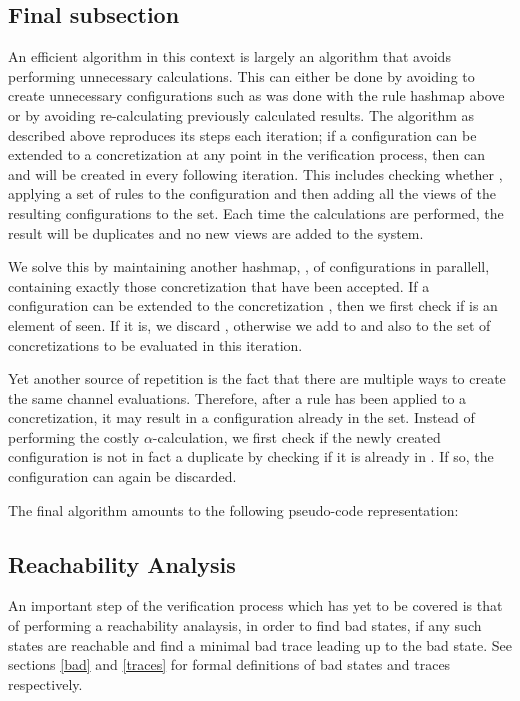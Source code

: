\subsection{Final subsection}
An efficient algorithm in this context is largely an algorithm that avoids performing unnecessary calculations. This can either be done by avoiding to create unnecessary configurations such as was done with the rule hashmap above or by avoiding re-calculating previously calculated results. The algorithm as described above reproduces its steps each iteration; if a configuration  can be extended to a concretization  at any point in the verification process, then  can and will be created in every following iteration. This includes checking whether , applying a set of rules to the configuration and then adding all the views of the resulting configurations to the set. Each time the calculations are performed, the result will be duplicates and no new views are added to the system.

We solve this by maintaining another hashmap, , of configurations in parallell, containing exactly those concretization that have been accepted. If a configuration  can be extended to the concretization , then we first check if  is an element of seen. If it is, we discard , otherwise we add  to  and also to the set of concretizations to be evaluated in this iteration.

Yet another source of repetition is the fact that there are multiple ways to create the same channel evaluations. Therefore, after a rule has been applied to a concretization, it may result in a configuration already in the set. Instead of performing the costly $\alpha$-calculation, we first check if the newly created configuration is not in fact a duplicate by checking if it is already in . If so, the configuration can again be discarded.

The final algorithm amounts to the following pseudo-code representation:

\subsection{Reachability Analysis}
An important step of the verification process which has yet to be covered is that of performing a reachability analaysis, in order to find bad states, if any such states are reachable and find a minimal bad trace leading up to the bad state. See sections \ref{bad} and \ref{traces} for formal definitions of bad states and traces respectively.

